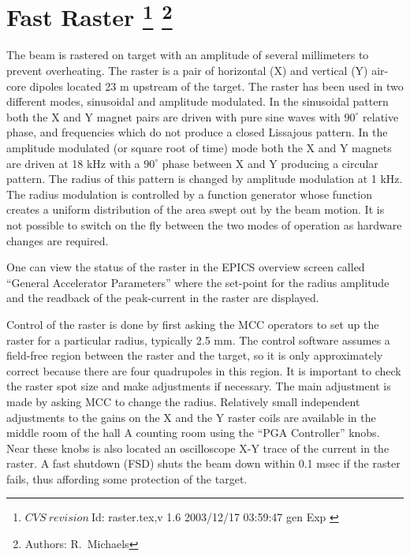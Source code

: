 \section[Fast Raster]{Fast Raster
\footnote{
  $CVS~revision~ $Id: raster.tex,v 1.6 2003/12/17 03:59:47 gen Exp $ $
}
\footnote{Authors: R.~Michaels }
}

The beam is rastered on target with an amplitude of
several millimeters to prevent overheating.  
The raster is a pair of horizontal (X) and vertical (Y)
air-core dipoles located 23 m upstream of the
target. The raster has been used in two different modes,
sinusoidal and amplitude modulated. In the sinusoidal pattern
both the X and Y magnet pairs are driven with pure sine waves
with $90^{\circ}$ relative phase, 
and frequencies which do not produce a closed Lissajous pattern.
In the amplitude modulated (or square root of time) mode  
both the X and Y magnets are driven at 18 kHz with
a $90^{\circ}$ phase between X and Y producing  a circular
pattern. The radius of this pattern is changed by amplitude
modulation at 1 kHz. The radius modulation
is controlled by a function generator whose function
creates a uniform distribution of the area swept out
by the beam motion. It is not possible to switch on the fly
between the two modes of operation as hardware changes are required.

One can view the status of the raster in the
EPICS overview screen called ``General Accelerator
Parameters'' where the set-point for the radius amplitude
and the readback of the peak-current in the raster are displayed.

Control of the raster is done by first asking the MCC
operators to set up the raster for a particular radius, 
typically 2.5 mm.
The control software assumes a field-free region between
the raster and the target, so it is only approximately
correct because there are four quadrupoles in this region.
It is important to check the raster spot size and
make adjustments if necessary.  The main adjustment is made
by asking MCC to change the radius.
Relatively small independent adjustments to the 
gains on the X and the Y raster
coils are available in the middle room of the hall A
counting room using the ``PGA Controller'' knobs.
Near these knobs is also located an oscilloscope X-Y trace
of the current in the raster.  A fast shutdown (FSD) shuts
the beam down within 0.1 msec if the raster fails, thus
affording some protection of the target.

